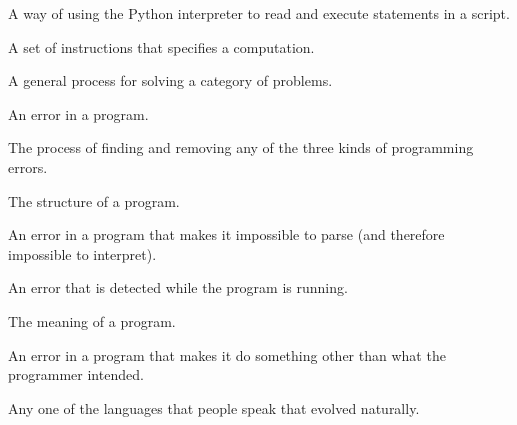 \begin{vocabulary} A way of using the Python interpreter to read
	and execute statements in a script.
\end{vocabulary}
	
\begin{vocabulary}[program:] A set of instructions that specifies a computation.
\end{vocabulary}
	
\begin{vocabulary}[algorithm:]  A general process for solving a category of
	problems.
\end{vocabulary}
	
\begin{vocabulary}[bug:]  An error in a program.
\end{vocabulary}
	
\begin{vocabulary}[debugging:]  The process of finding and removing any of the
	three kinds of programming errors.
\end{vocabulary}
	
\begin{vocabulary}[syntax:]  The structure of a program.
\end{vocabulary}
	
\begin{vocabulary}  An error in a program that makes it impossible
	to parse (and therefore impossible to interpret).
\end{vocabulary}
	
\begin{vocabulary}[exception:]  An error that is detected while the program is running.
\end{vocabulary}
	
\begin{vocabulary}[semantics:]  The meaning of a program.
\end{vocabulary}
	
\begin{vocabulary}   An error in a program that makes it do something
	other than what the programmer intended.
\end{vocabulary}
	
\begin{vocabulary}  Any one of the languages that people speak that
	evolved naturally.
\end{vocabulary}
	
